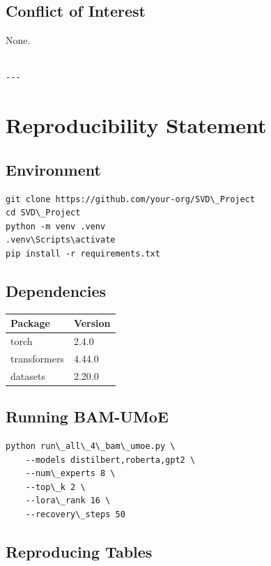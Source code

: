 \subsection{Conflict of Interest}

None.
\begin{lstlisting}

---
\end{lstlisting}

\section{Reproducibility Statement}

\subsection{Environment}

\begin{lstlisting}
git clone https://github.com/your-org/SVD\_Project
cd SVD\_Project
python -m venv .venv
.venv\Scripts\activate
pip install -r requirements.txt
\end{lstlisting}

\subsection{Dependencies}

\begin{table}[H]
\centering
\small
\begin{tabular}{ll}
\toprule
\textbf{Package} & \textbf{Version} \\
\midrule
torch & 2.4.0 \\
transformers & 4.44.0 \\
datasets & 2.20.0 \\
\bottomrule
\end{tabular}
\end{table}

\subsection{Running BAM-UMoE}

\begin{lstlisting}
python run\_all\_4\_bam\_umoe.py \
    --models distilbert,roberta,gpt2 \
    --num\_experts 8 \
    --top\_k 2 \
    --lora\_rank 16 \
    --recovery\_steps 50
\end{lstlisting}

\subsection{Reproducing Tables}

